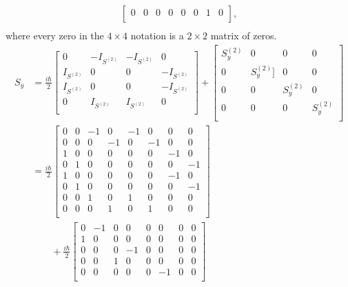 \begin{example}
\begin{equation}
\begin{split}
\begin{bmatrix}
				0 & 0 & 0 & 0 & 0 & 0 & 1 & 0 \\
			\end{bmatrix} ,\\
		\end{split}
	\end{equation} 
	where every zero in the $4\times4$ notation is a $2\times2$ matrix of zeros.
	\begin{equation}
		\begin{split}
			S_y&=\frac{i\hbar}{2}\begin{bmatrix}
				0 & -I_{S^{(2)}} & -I_{S^{(2)}} & 0 \\
				I_{S^{(2)}} & 0 & 0 & -I_{S^{(2)}} \\
				I_{S^{(2)}} & 0 & 0 & -I_{S^{(2)}} \\
				0 & I_{S^{(2)}} & I_{S^{(2)}} & 0 \\
			\end{bmatrix}+\begin{bmatrix}
				S^{(2)}_y & 0 & 0 & 0 \\
				0 & S^{(2)}_y] & 0 & 0 \\
				0 & 0 & S^{(2)}_y & 0 \\
				0 & 0 & 0 & S^{(2)}_y \\
			\end{bmatrix} \\
			&=\frac{i\hbar}{2}\begin{bmatrix}
				0 & 0 & -1 & 0 & -1 & 0 & 0 & 0 \\
				0 & 0 & 0 & -1 & 0 & -1 & 0 & 0 \\
				1 & 0 & 0 & 0 & 0 & 0 & -1 & 0 \\
				0 & 1 & 0 & 0 & 0 & 0 & 0 & -1 \\
				1 & 0 & 0 & 0 & 0 & 0 & -1 & 0 \\
				0 & 1 & 0 & 0 & 0 & 0 & 0 & -1 \\
				0 & 0 & 1 & 0 & 1 & 0 & 0 & 0 \\
				0 & 0 & 0 & 1 & 0 & 1 & 0 & 0 \\
			\end{bmatrix}\\
			&\qquad+\frac{i\hbar}{2}\begin{bmatrix}
				0 & -1 & 0 & 0 & 0 & 0 & 0 & 0 \\
				1 & 0 & 0 & 0 & 0 & 0 & 0 & 0 \\
				0 & 0 & 0 & -1 & 0 & 0 & 0 & 0 \\
				0 & 0 & 1 & 0 & 0 & 0 & 0 & 0 \\
				0 & 0 & 0 & 0 & 0 & -1 & 0 & 0 \\

\end{bmatrix}
\end{split}
\end{equation}
\end{example}
